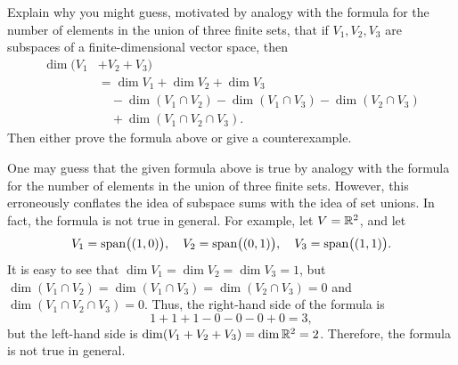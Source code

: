 \begin{exc}
\begin{exercise}
Explain why you might guess, motivated by analogy with the formula for the
number of elements in the union of three finite sets, that if $V_1,V_2,V_3$ are
subspaces of a finite-dimensional vector space, then
\begin{align*}
\dim(V_1&+V_2+V_3)\\
  &= \dim V_1+\dim V_2+\dim V_3\\
  &\quad-\dim(V_1\cap V_2)-\dim(V_1\cap V_3)-\dim(V_2\cap V_3)\\
  &\quad+\dim(V_1\cap V_2\cap V_3).
\end{align*}
Then either prove the formula above or give a counterexample.
\end{exercise}
\begin{solution}
One may guess that the given formula above is true by analogy with the formula
for the number of elements in the union of three finite sets. However, this
erroneously conflates the idea of subspace sums with the idea of set unions. In
fact, the formula is not true in general. For example, let $V=\mathbb{R}^2$, and let
\[ V_1=\operatorname{span}\bigl((1,0)\bigr), \quad V_2=\operatorname{span}\bigl((0,1)\bigr), \quad
   V_3=\operatorname{span}\bigl((1,1)\bigr). \]
It is easy to see that $\dim V_1=\dim V_2=\dim V_3=1$, but
$\dim(V_1\cap V_2)=\dim(V_1\cap V_3)=\dim(V_2\cap V_3)=0$ and
$\dim(V_1\cap V_2\cap V_3)=0$. Thus, the right-hand side of the formula is
\[ 1+1+1-0-0-0+0 = 3, \]
but the left-hand side is $\operatorname{dim}(V_1+V_2+V_3)=\operatorname{dim}\mathbb{R}^2=2$. Therefore, the
formula is not true in general.
\end{solution}


\end{exc}
